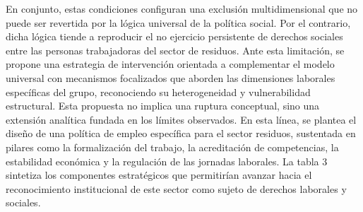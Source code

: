 \documentclass[
  spanish,
  11.5pt,
  170mm x 240mmpaper,
]{scrbook}
\begin{document}
En conjunto, estas condiciones configuran una exclusión multidimensional
que no puede ser revertida por la lógica universal de la política
social. Por el contrario, dicha lógica tiende a reproducir el no
ejercicio persistente de derechos sociales entre las personas
trabajadoras del sector de residuos. Ante esta limitación, se propone
una estrategia de intervención orientada a complementar el modelo
universal con mecanismos focalizados que aborden las dimensiones
laborales específicas del grupo, reconociendo su heterogeneidad y
vulnerabilidad estructural. Esta propuesta no implica una ruptura
conceptual, sino una extensión analítica fundada en los límites
observados. En esta línea, se plantea el diseño de una política de
empleo específica para el sector residuos, sustentada en pilares como la
formalización del trabajo, la acreditación de competencias, la
estabilidad económica y la regulación de las jornadas laborales. La
tabla 3 sintetiza los componentes estratégicos que permitirían avanzar
hacia el reconocimiento institucional de este sector como sujeto de
derechos laborales y sociales.

\begingroup
\scriptsize
\end{document}
